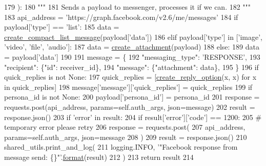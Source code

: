\begin{DoxyCode}
179     ):
180         \textcolor{stringliteral}{"""}
181 \textcolor{stringliteral}{        Sends a payload to messenger, processes it if we can.}
182 \textcolor{stringliteral}{        """}
183         api\_address = \textcolor{stringliteral}{'https://graph.facebook.com/v2.6/me/messages'}
184         \textcolor{keywordflow}{if} payload[\textcolor{stringliteral}{'type'}] == \textcolor{stringliteral}{'list'}:
185             data = \hyperlink{namespaceparlai_1_1chat__service_1_1services_1_1messenger_1_1message__sender_aad605cb9ba870a032f7b09775bebabb1}{create\_compact\_list\_message}(payload[\textcolor{stringliteral}{'data'}])
186         \textcolor{keywordflow}{elif} payload[\textcolor{stringliteral}{'type'}] \textcolor{keywordflow}{in} [\textcolor{stringliteral}{'image'}, \textcolor{stringliteral}{'video'}, \textcolor{stringliteral}{'file'}, \textcolor{stringliteral}{'audio'}]:
187             data = \hyperlink{namespaceparlai_1_1chat__service_1_1services_1_1messenger_1_1message__sender_a8303c44a600b84c0d42770128be13e9a}{create\_attachment}(payload)
188         \textcolor{keywordflow}{else}:
189             data = payload[\textcolor{stringliteral}{'data'}]
190 
191         message = \{
192             \textcolor{stringliteral}{"messaging\_type"}: \textcolor{stringliteral}{'RESPONSE'},
193             \textcolor{stringliteral}{"recipient"}: \{\textcolor{stringliteral}{"id"}: receiver\_id\},
194             \textcolor{stringliteral}{"message"}: \{\textcolor{stringliteral}{"attachment"}: data\},
195         \}
196         \textcolor{keywordflow}{if} quick\_replies \textcolor{keywordflow}{is} \textcolor{keywordflow}{not} \textcolor{keywordtype}{None}:
197             quick\_replies = [\hyperlink{namespaceparlai_1_1chat__service_1_1services_1_1messenger_1_1message__sender_a895e006007913ad0fde9c2c9bf9ec5a5}{create\_reply\_option}(x, x) \textcolor{keywordflow}{for} x \textcolor{keywordflow}{in} quick\_replies]
198             message[\textcolor{stringliteral}{'message'}][\textcolor{stringliteral}{'quick\_replies'}] = quick\_replies
199         \textcolor{keywordflow}{if} persona\_id \textcolor{keywordflow}{is} \textcolor{keywordflow}{not} \textcolor{keywordtype}{None}:
200             payload[\textcolor{stringliteral}{'persona\_id'}] = persona\_id
201         response = requests.post(api\_address, params=self.auth\_args, json=message)
202         result = response.json()
203         \textcolor{keywordflow}{if} \textcolor{stringliteral}{'error'} \textcolor{keywordflow}{in} result:
204             \textcolor{keywordflow}{if} result[\textcolor{stringliteral}{'error'}][\textcolor{stringliteral}{'code'}] == 1200:
205                 \textcolor{comment}{# temporary error please retry}
206                 response = requests.post(
207                     api\_address, params=self.auth\_args, json=message
208                 )
209                 result = response.json()
210         shared\_utils.print\_and\_log(
211             logging.INFO, \textcolor{stringliteral}{'"Facebook response from message send: \{\}"'}.\hyperlink{namespaceparlai_1_1chat__service_1_1services_1_1messenger_1_1shared__utils_a32e2e2022b824fbaf80c747160b52a76}{format}(result)
212         )
213         \textcolor{keywordflow}{return} result
214 
\end{DoxyCode}
